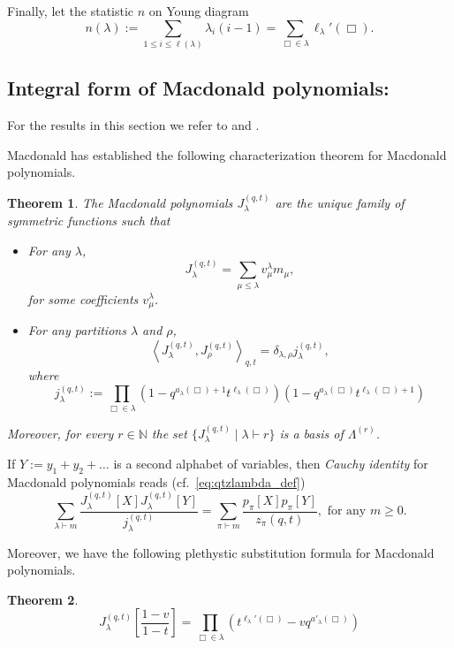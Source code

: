 \documentclass[12pt]{amsart}
\newtheorem{thm}{Theorem}[section]
\theoremstyle{remark}
\newcommand{\J}{{J}^{(q,t)}}
\newcommand{\normJ}{{j}^{(q,t)}}
\begin{document}
Finally, let the  statistic $n$ on Young diagram 
\begin{equation}\label{eq n}
  n(\lambda):=\sum_{1\leq i\leq \ell(\lambda)}\lambda_{i}(i-1)=\sum_{\Box\in\lambda}\ell_\lambda'(\Box).  
\end{equation}

\subsection{Integral form of Macdonald polynomials:}\label{ssec integral form}

For the results in this section we refer to \cite[Chapter VI]{Macdonald1995} and \cite{GarsiaTeslerAdvances96}.

Macdonald has established the following characterization theorem for Macdonald  polynomials.
\begin{thm}
The Macdonald polynomials $\J_\lambda$ are the unique family of symmetric functions such that
\begin{itemize}
    \item For any $\lambda$,
    $$\J_\lambda=\sum_{\mu\leq \lambda}v^\lambda_\mu m_\mu,$$
for some coefficients $v^\lambda_\mu$.

\item For any partitions $\lambda$ and $\rho$, $$\left\langle\J_\lambda,\J_\rho\right\rangle_{q,t}=\delta_{\lambda,\rho}\normJ_\lambda, $$
where 
\begin{equation}\label{eq j norm}
    \normJ_\lambda:=\prod_{\Box\in\lambda}\left(1-q^{a_\lambda(\Box)+1}t^{\ell_\lambda(\Box)}\right)\left(1-q^{ a_\lambda(\Box)}t^{\ell_\lambda(\Box)+1}\right)
\end{equation}
\end{itemize}
Moreover, for every $r\in \mathbb{N}$ the set $\{\J_\lambda\mid \lambda\vdash r\}$ is a basis of $\Lambda^{(r)}$.
\end{thm}

If $Y:=y_1+y_2+\dots$ is a second alphabet of variables, then \textit{Cauchy identity} for Macdonald polynomials reads (cf.\ \cref{eq:qtzlambda_def})
\begin{equation}\label{eq Cauchy}
    \sum_{\lambda\vdash m}\frac{\J_\lambda[X]\J_\lambda[Y]}{\normJ_\lambda}=\sum_{\pi\vdash m}\frac{p_\pi[X]p_\pi[Y]}{z_\pi(q,t)}, \text{ for any $m\geq 0$.}
\end{equation}

\noindent Moreover, we have the following plethystic substitution formula for Macdonald polynomials.
\begin{thm}\label{thm plethystic subt}
    $$\J_\lambda\left[\frac{1-v}{1-t}\right]=\prod_{\Box\in\lambda}\left(t^{\ell_\lambda'(\Box)}-vq^{a'_\lambda(\Box)}\right)$$
\end{thm}
\end{document}
